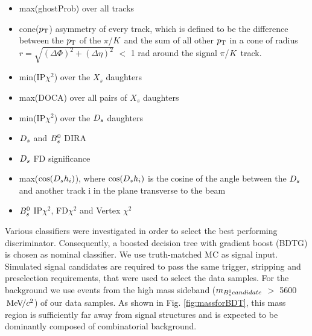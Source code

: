 \begin{itemize} 

\item max(ghostProb) over all tracks

\item cone($\mbox{$p_{\mathrm{ T}}$}$) asymmetry of every track, 
which is defined to be the difference between the $\mbox{$p_{\mathrm{ T}}$}$ of the $\pi$/${K}$ and the sum of all other $\mbox{$p_{\mathrm{ T}}$}$ in a cone of radius $r = \sqrt{(\Delta\Phi)^{2} + (\Delta\eta)^{2}}$ $<$ 1 rad around the signal $\pi$/${K}$ track.

\item min(IP$\chi^{2}$) over the $X_{s}$ daughters

\item max(DOCA) over all pairs of $X_{s}$ daughters

\item min(IP$\chi^{2}$) over the ${{D}_{s}}$ daughters

\item ${{D}_{s}}$ and ${{B}^0_{s}}$ DIRA

\item ${{D}_{s}}$ FD significance

\item max($\cos({{D}_{s}} h_{i})$), where $\cos({{D}_{s}} h_{i})$ is the cosine of the angle between the ${{D}_{s}}$ and another track i in the plane transverse to the beam

\item ${{B}^0_{s}}$ IP$\chi^{2}$, FD$\chi^{2}$ and Vertex $\chi^{2}$

\end{itemize}

Various classifiers were investigated in order to select the best performing discriminator. Consequently, a boosted decision tree with gradient boost (BDTG) is chosen as nominal classifier. 
We use truth-matched MC as signal input. 
Simulated signal candidates are required to pass the same trigger, stripping and preselection requirements, that were used to select the data samples.  
For the background we use events from the high mass sideband ($m_{{{B}^0_{s}} candidate}$ $>$ 5600 ${\mathrm{\,Me\kern -0.1em V\!/}c^2}$) of our data samples. 
As shown in Fig. \ref{fig:massforBDT}, this mass region is sufficiently far away from signal structures and is expected to be dominantly composed of combinatorial background. \newline

